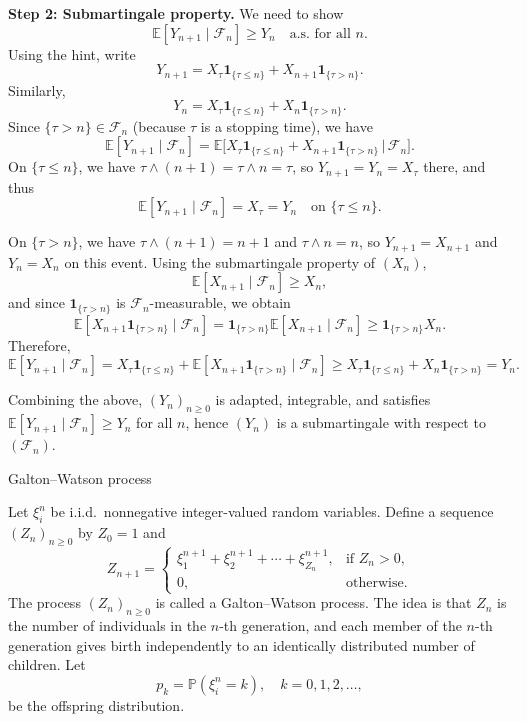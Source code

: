 \documentclass[answers,12pt,addpoints]{exam}
\begin{document}
\begin{questions}
\begin{solution}
\medskip

\textbf{Step 2: Submartingale property.}
We need to show
\[
\mathbb{E}[Y_{n+1} \mid \mathcal{F}_n] \ge Y_n \quad \text{a.s. for all } n.
\]
Using the hint, write
\[
Y_{n+1} = X_\tau \mathbf{1}_{\{\tau \le n\}} + X_{n+1} \mathbf{1}_{\{\tau > n\}}.
\]
Similarly,
\[
Y_n = X_\tau \mathbf{1}_{\{\tau \le n\}} + X_n \mathbf{1}_{\{\tau > n\}}.
\]
Since $\{\tau > n\} \in \mathcal{F}_n$ (because $\tau$ is a stopping time), we have
\[
\mathbb{E}[Y_{n+1} \mid \mathcal{F}_n]
= \mathbb{E}\big[X_\tau \mathbf{1}_{\{\tau \le n\}} + X_{n+1} \mathbf{1}_{\{\tau > n\}} \,\big|\, \mathcal{F}_n\big].
\]
On $\{\tau \le n\}$, we have $\tau \wedge (n+1) = \tau \wedge n = \tau$, so $Y_{n+1} = Y_n = X_\tau$ there, and thus
\[
\mathbb{E}[Y_{n+1} \mid \mathcal{F}_n] = X_\tau = Y_n \quad \text{on } \{\tau \le n\}.
\]

On $\{\tau > n\}$, we have $\tau \wedge (n+1) = n+1$ and $\tau \wedge n = n$, so $Y_{n+1} = X_{n+1}$ and $Y_n = X_n$ on this event. Using the submartingale property of $(X_n)$,
\[
\mathbb{E}[X_{n+1} \mid \mathcal{F}_n] \ge X_n,
\]
and since $\mathbf{1}_{\{\tau > n\}}$ is $\mathcal{F}_n$-measurable, we obtain
\[
\mathbb{E}[X_{n+1} \mathbf{1}_{\{\tau > n\}} \mid \mathcal{F}_n]
= \mathbf{1}_{\{\tau > n\}} \mathbb{E}[X_{n+1} \mid \mathcal{F}_n]
\ge \mathbf{1}_{\{\tau > n\}} X_n.
\]
Therefore,
\[
\mathbb{E}[Y_{n+1} \mid \mathcal{F}_n]
= X_\tau \mathbf{1}_{\{\tau \le n\}} + 
\mathbb{E}[X_{n+1} \mathbf{1}_{\{\tau > n\}} \mid \mathcal{F}_n]
\ge X_\tau \mathbf{1}_{\{\tau \le n\}} + X_n \mathbf{1}_{\{\tau > n\}}
= Y_n.
\]

\medskip

Combining the above, $(Y_n)_{n\ge 0}$ is adapted, integrable, and satisfies
\(\mathbb{E}[Y_{n+1} \mid \mathcal{F}_n] \ge Y_n\) for all $n$, hence $(Y_n)$ is a submartingale with respect to $(\mathcal{F}_n)$.
\end{solution}

\newpage

\question Galton--Watson process

Let \(\xi_i^n\) be i.i.d.\ nonnegative integer-valued random variables. Define a sequence \((Z_n)_{n \ge 0}\) by \(Z_0 = 1\) and
\[
Z_{n+1} =
\begin{cases}
\xi^{n+1}_1 + \xi^{n+1}_2 + \cdots + \xi^{n+1}_{Z_n}, & \text{if } Z_n > 0,\\[0.3em]
0, & \text{otherwise}.
\end{cases}
\]
The process \((Z_n)_{n \ge 0}\) is called a Galton--Watson process. The idea is that \(Z_n\) is the number of individuals in the \(n\)-th generation, and each member of the \(n\)-th generation gives birth independently to an identically distributed number of children. Let
\[
p_k = \mathbb{P}(\xi_i^n = k), \quad k = 0,1,2,\dots,
\]
be the offspring distribution.


\end{questions}
\end{document}
